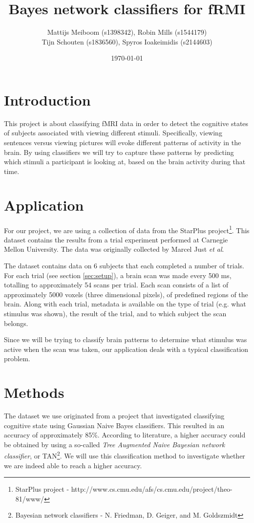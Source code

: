 \documentclass[a4paper, 11pt]{scrartcl}
\title{\Large Bayes network classifiers for fRMI}
\author{\small Mattijs Meiboom (s1398342), Robin Mills (s1544179)\\
			\small Tijn Schouten (s1836560), Spyros Ioakeimidis (s2144603)}
\date{\small \today}
\begin{document}
\maketitle

\thispagestyle{empty}

\section{Introduction}

This project is about classifying fMRI data in order to detect the cognitive states of subjects associated with viewing different stimuli. Specifically, viewing sentences versus viewing pictures will evoke different patterns of activity in the brain. By using classifiers we will try to capture these patterns by predicting which stimuli a participant is looking at, based on the brain activity during that time.

\section{Application}
\label{sec:application}

For our project, we are using a collection of data from the StarPlus project\footnote{StarPlus project - http://www.cs.cmu.edu/afs/cs.cmu.edu/project/theo-81/www/}. This dataset contains the results from a trial experiment performed at Carnegie Mellon University. The data was originally collected by Marcel Just \textit{et al}.

The dataset contains data on 6 subjects that each completed a number of trials. For each trial (see section \ref{sec:setup}), a brain scan was made every 500 ms, totalling to approximately 54 scans per trial. Each scan consists of a list of approximately 5000 voxels (three dimensional pixels), of predefined regions of the brain. Along with each trial, metadata is available on the type of trial (e.g. what stimulus was shown), the result of the trial, and to which subject the scan belongs.

Since we will be trying to classify brain patterns to determine what stimulus was active when the scan was taken, our application deals with a typical classification problem.

\section{Methods}
\label{sec:methods}

The dataset we use originated from a project that investigated classifying cognitive state using Gaussian Naive Bayes classifiers. This resulted in an accuracy of approximately 85\%. According to literature, a higher accuracy could be obtained by using a so-called \textit{Tree Augmented Naive Bayesian network classifier}, or TAN\footnote{Bayesian network classifiers - N. Friedman, D. Geiger, and M. Goldszmidt}. We will use this classification method to investigate whether we are indeed able to reach a higher accuracy.
\end{document}

